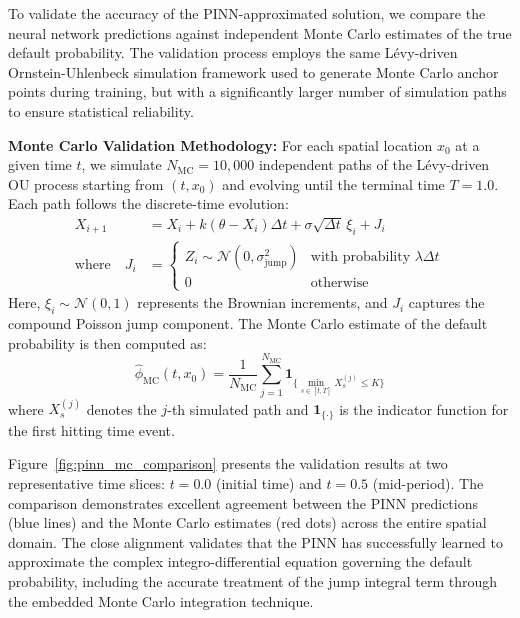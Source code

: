\documentclass[11pt,twoside,openright]{report}
\begin{document}
To validate the accuracy of the PINN-approximated solution, we compare the neural network predictions against independent Monte Carlo estimates of the true default probability. The validation process employs the same Lévy-driven Ornstein-Uhlenbeck simulation framework used to generate Monte Carlo anchor points during training, but with a significantly larger number of simulation paths to ensure statistical reliability.

\textbf{Monte Carlo Validation Methodology:} For each spatial location $x_0$ at a given time $t$, we simulate $N_{\text{MC}} = 10,000$ independent paths of the Lévy-driven OU process starting from $(t, x_0)$ and evolving until the terminal time $T = 1.0$. Each path follows the discrete-time evolution:
\begin{align}
X_{i+1} &= X_i + k(\theta - X_i)\Delta t + \sigma \sqrt{\Delta t} \, \xi_i + J_i \\
\text{where} \quad J_i &= \begin{cases}
Z_i \sim \mathcal{N}(0, \sigma_{\text{jump}}^2) & \text{with probability } \lambda \Delta t \\
0 & \text{otherwise}
\end{cases}
\end{align}
Here, $\xi_i \sim \mathcal{N}(0,1)$ represents the Brownian increments, and $J_i$ captures the compound Poisson jump component. The Monte Carlo estimate of the default probability is then computed as:
$$
\hat{\phi}_{\text{MC}}(t, x_0) = \frac{1}{N_{\text{MC}}} \sum_{j=1}^{N_{\text{MC}}} \mathbf{1}_{\{\min_{s \in [t,T]} X_s^{(j)} \leq K\}}
$$
where $X_s^{(j)}$ denotes the $j$-th simulated path and $\mathbf{1}_{\{\cdot\}}$ is the indicator function for the first hitting time event.

Figure~\ref{fig:pinn_mc_comparison} presents the validation results at two representative time slices: $t = 0.0$ (initial time) and $t = 0.5$ (mid-period). The comparison demonstrates excellent agreement between the PINN predictions (blue lines) and the Monte Carlo estimates (red dots) across the entire spatial domain. The close alignment validates that the PINN has successfully learned to approximate the complex integro-differential equation governing the default probability, including the accurate treatment of the jump integral term through the embedded Monte Carlo integration technique.
\end{document}
